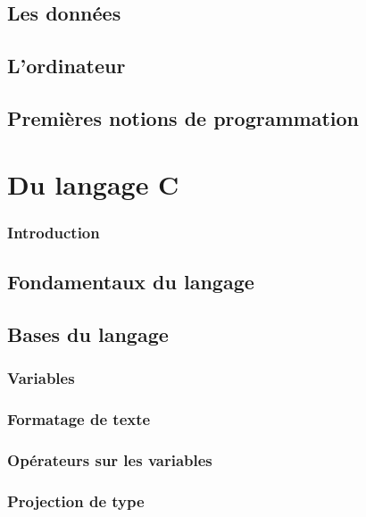 \documentclass{minitelreport}
\begin{document}
\begin{refsection}
	\chapter{Les données}
	\label{cha:les_donn_es}
		
	\chapter{L'ordinateur}
	\label{cha:l_ordinateur}
		
	\chapter{Premières notions de programmation}
	\label{cha:programmer_un_ordinateur}
		
\part{Du langage C}
\label{part:du_langage_c}
	\section*{Introduction}
	
	\chapter{Fondamentaux du langage}
	\label{chap:fondamentaux_du_langage}
		
	\chapter{Bases du langage}
	\label{chap:bases_du_langage}
		\section{Variables}
			\label{sec:variables}
			
		\section{Formatage de texte}
			\label{sec:formatage_du_texte}
			
		\section{Opérateurs sur les variables}
			\label{sec:operateurs_variables}
			
		\section{Projection de type}
			\label{sec:projection_type}
			

\end{refsection}
\end{document}
